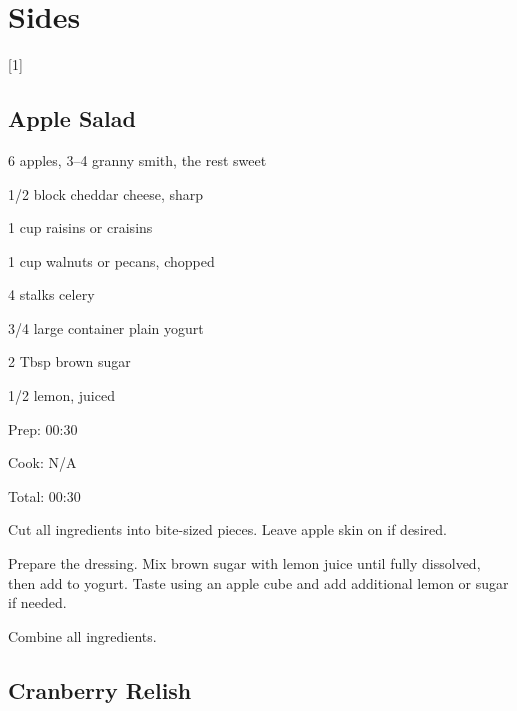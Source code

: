 \documentclass[oneside]{book}  %
\def\thisrecipe{}  %
\newcommand{\chapterrec}[1]{  %
  \newpage \def\thisrecipe{} \chapter{#1} \vspace{1.1em}
}
\newcommand{\chaptertoc}[1]{  %
  \chapterrec{#1} \vspace{-1.1em}  %
  \startcontents[chapters] \printcontents[chapters]{chapter_toc_}{1}[1]{}
}
\newcommand{\recipe}[1]{\section{#1}\def\thisrecipe{: #1}} %
\begin{document}
\chaptertoc{Sides} \label{chap:sides}
\recipe{Apple Salad} \label{recipe:apple_salad} %

\begin{IT}
  \begin{ingredients}
  \item[6] apples, 3--4 granny smith, the rest sweet
  \item[1/2 block]  cheddar cheese, sharp
  \item[1 cup] raisins or craisins
  \item[1 cup] walnuts or pecans, chopped
  \item[4 stalks] celery
  \item[3/4 large container] plain yogurt 
  \item[2 Tbsp] brown sugar
  \item[1/2] lemon, juiced
  \end{ingredients}

  \switchcolumn

  \begin{timeline}
    \item[Prep:]  00:30
    \item[Cook:]  N/A
    \item[Total:] 00:30
  \end{timeline}
\end{IT}

\begin{directions}
  \item Cut all ingredients into bite-sized pieces. Leave apple skin on if
    desired.
  \item Prepare the dressing. Mix brown sugar with lemon juice until fully
    dissolved, then add to yogurt. Taste using an apple cube and add additional
    lemon or sugar if needed.

  \columnbreak

  \item Combine all ingredients.
\end{directions}
\recipe{Cranberry Relish} \label{recipe:cranberry_relish} %
\end{document}
